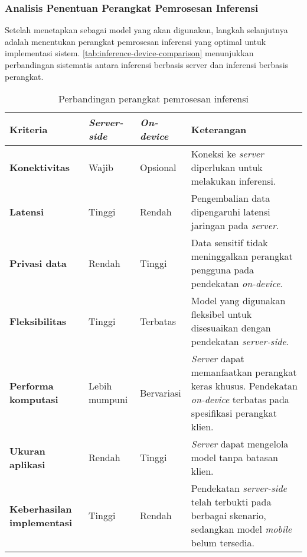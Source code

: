 \subsubsection{Analisis Penentuan Perangkat Pemrosesan Inferensi}
\label{subsubsec:analisis-penentuan-perangkat-pemrosesan-inferensi}

Setelah menetapkan \donut{} sebagai model yang akan digunakan, langkah selanjutnya adalah menentukan perangkat pemrosesan inferensi yang optimal untuk implementasi sistem. \autoref{tab:inference-device-comparison} menunjukkan perbandingan sistematis antara inferensi berbasis server dan inferensi berbasis perangkat.

\begin{table}[h!]
\caption{Perbandingan perangkat pemrosesan inferensi}
\label{tab:inference-device-comparison}
\begin{tabularx}{\linewidth}{|p{3cm}|p{2cm}|p{2cm}|X|}
\hline
\textbf{Kriteria} & \textbf{\emph{Server-side}} & \textbf{\emph{On-device}} & \textbf{Keterangan} \\
\hline
\textbf{Konektivitas} & Wajib & Opsional & Koneksi ke \emph{server} diperlukan untuk melakukan inferensi. \\
\hline
\textbf{Latensi} & Tinggi & Rendah & Pengembalian data dipengaruhi latensi jaringan pada \emph{server}. \\
\hline
\textbf{Privasi data} & Rendah & Tinggi & Data sensitif tidak meninggalkan perangkat pengguna pada pendekatan \emph{on-device}. \\
\hline
\textbf{Fleksibilitas} & Tinggi & Terbatas & Model yang digunakan fleksibel untuk disesuaikan dengan pendekatan \emph{server-side}. \\
\hline
\textbf{Performa komputasi} & Lebih mumpuni & Bervariasi & \emph{Server} dapat memanfaatkan perangkat keras khusus. Pendekatan \emph{on-device} terbatas pada spesifikasi perangkat klien. \\
\hline
\textbf{Ukuran aplikasi} & Rendah & Tinggi & \emph{Server} dapat mengelola model tanpa batasan klien. \\
\hline
\textbf{Keberhasilan implementasi} & Tinggi & Rendah & Pendekatan \emph{server-side} telah terbukti pada berbagai skenario, sedangkan model \emph{mobile} belum tersedia. \\
\hline
\end{tabularx}
\end{table}


